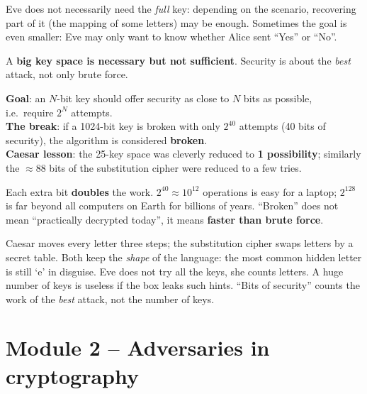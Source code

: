 \begin{rembox}[title=Goal of the adversary]
Eve does not necessarily need the \emph{full} key: depending on the scenario, recovering
part of it (the mapping of some letters) may be enough. Sometimes the goal is even
smaller: Eve may only want to know whether Alice sent ``Yes'' or ``No''.
\end{rembox}

\begin{keybox}[title=Lesson]
A \textbf{big key space is necessary but not sufficient}. Security is about the
\emph{best} attack, not only brute force.
\end{keybox}

\begin{defnbox}[title=Bits of security]
\textbf{Goal}: an $N$-bit key should offer security as close to $N$ bits as possible,
i.e.\ require $2^N$ attempts. \\
\textbf{The break}: if a 1024-bit key is broken with only $2^{40}$ attempts (40 bits of
security), the algorithm is considered \textbf{broken}. \\
\textbf{Caesar lesson}: the 25-key space was cleverly reduced to \textbf{1 possibility};
similarly the $\approx 88$ bits of the substitution cipher were reduced to a few tries.
\end{defnbox}

\begin{rembox}[title=Orders of magnitude]
Each extra bit \textbf{doubles} the work. $2^{40} \approx 10^{12}$ operations is easy for
a laptop; $2^{128}$ is far beyond all computers on Earth for billions of years. ``Broken''
does not mean ``practically decrypted today'', it means \textbf{faster than brute
force}.
\end{rembox}

\begin{goatbox}
Caesar moves every letter three steps; the substitution cipher swaps letters by a secret table.
Both keep the \emph{shape} of the language: the most common hidden letter is still `e' in
disguise. Eve does not try all the keys, she counts letters. A huge number of keys is useless if
the box leaks such hints. ``Bits of security'' counts the work of the \emph{best} attack, not the
number of keys.
\end{goatbox}

\section{Module 2 -- Adversaries in cryptography}

